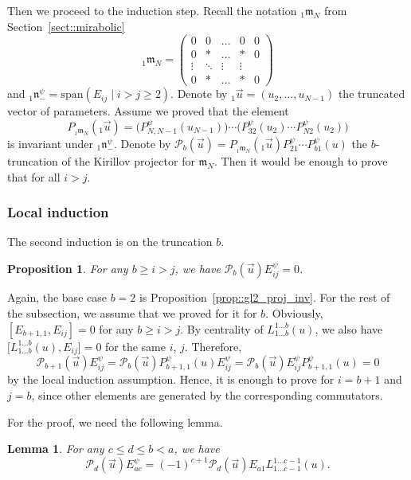 \documentclass[10pt,a4paper]{article}
\numberwithin{equation}{section}
\newtheorem{Lemma}[Theorem]{Lemma}
\newtheorem{Proposition}[Theorem]{Proposition}
{ \theoremstyle{definition}
	\newtheorem{Definition}[Theorem]{Definition}
	\newtheorem{Note}[Theorem]{Note}
	\newtheorem{Example}[Theorem]{Example}
	\newtheorem{Remark}[Theorem]{Remark} }
\newcommand{\calP}{\mathcal{P}}
\newcommand{\n}{\mathfrak{n}}
\newcommand{\m}{\mathfrak{m}}
\begin{document}
	Then we proceed to the induction step. Recall the notation ${}_1\m_N$ from Section~\ref{sect::mirabolic}
	\begin{equation}
		\label{eq::mirabolic_lower_corner}
		{}_1\m_{N} =
		\begin{pmatrix}
			0 & 0 &\dots & 0 & 0 \\
			0 & * & \dots & * & 0 \\
			\vdots & \ddots & \vdots & \vdots \\
			0 & * & \dots & * & 0
		\end{pmatrix}
	\end{equation}
	and ${}_1\n_-^{\psi} = \mathrm{span}(E_{ij} \mid i > j \geq 2)$. Denote by ${}_1\vec{u} = (u_2,\dots,u_{N-1})$ the truncated vector of parameters. Assume we proved that the element
	\[
	P_{{}_1\m_N}({}_1\vec{u}) = \bigl(P_{N,N-1}^{\psi}(u_{N-1}) \bigr) \cdots \bigl(P_{32}^{\psi}(u_2) \cdots P_{N2}^{\psi}(u_2) \bigr)
	\]
	is invariant under ${}_1 \n_-^{\psi}$. Denote by
$
	\calP_b(\vec{u}) = P_{{}_1\m_N}({}_1\vec{u})P_{21}^{\psi} \cdots P_{b1}^{\psi}(u)
$
	the $b$-truncation of the Kirillov projector for $\m_N$. Then it would be enough to prove that
\smash{$
	\calP_N (\vec{u}) E_{ij}^{\psi} = 0$}
	for all $i>j$.
	
	\subsubsection{Local induction}
	The second induction is on the truncation $b$.
	\begin{Proposition}
		\label{prop::local_ind}
		For any $b \geq i > j$, we have
		$
		\calP_b(\vec{u}) E^{\psi}_{ij} = 0$.
	\end{Proposition}
	Again, the base case $b=2$ is Proposition~\ref{prop::gl2_proj_inv}. For the rest of the subsection, we assume that we proved for it for $b$. Obviously, $[E_{b+1,1},E_{ij}]=0$ for any $b\geq i > j$. By centrality of $L_{1\dots b}^{1\dots b}(u)$, we also have $\bigl[L_{1\dots b}^{1\dots b}(u),E_{ij}\bigr]=0$ for the same $i$, $j$. Therefore,
	\[
	\calP_{b+1}(\vec{u}) E^{\psi}_{ij} = \calP_{b}(\vec{u}) P_{b+1,1}^{\psi}(u) E^{\psi}_{ij} = \calP_{b}(\vec{u}) E_{ij}^{\psi} P_{b+1,1}^{\psi}(u) = 0
	\]
	by the local induction assumption. Hence, it is enough to prove for $i=b+1$ and $j=b$, since other elements are generated by the corresponding commutators.
	
	For the proof, we need the following lemma.
	\begin{Lemma}
		\label{lm::nilp_to_minor}
		For any $c\leq d \leq b < a$, we have
		\[
		\calP_d(\vec{u}) E_{ac}^{\psi} = (-1)^{c+1} \calP_d(\vec{u}) E_{a1} L_{1\dots c-1}^{1\dots c-1}(u).
		\]
	\end{Lemma}
	
\end{document}
